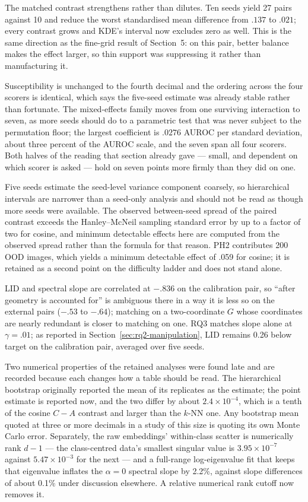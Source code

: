 \documentclass[11pt,a4paper]{article}
\begin{document}
The matched contrast strengthens rather than dilutes. Ten seeds yield 27 pairs
against 10 and reduce the worst standardised mean difference from $.137$ to
$.021$; every contrast grows and KDE's interval now excludes zero as well. This
is the same direction as the fine-grid result of Section~5: on this pair, better
balance makes the effect larger, so thin support was suppressing it rather than
manufacturing it.

Susceptibility is unchanged to the fourth decimal and the ordering across the
four scorers is identical, which says the five-seed estimate was already stable
rather than fortunate. The mixed-effects family moves from one surviving
interaction to seven, as more seeds should do to a parametric test that was
never subject to the permutation floor; the largest coefficient is $.0276$
AUROC per standard deviation, about three percent of the AUROC scale, and the
seven span all four scorers. Both halves of the reading that section already
gave --- small, and dependent on which scorer is asked --- hold on seven points
more firmly than they did on one.

Five seeds estimate the seed-level variance component coarsely, so hierarchical intervals are narrower than a seed-only analysis and should not be read as though more seeds were available. The observed between-seed spread of the paired contrast exceeds the Hanley--McNeil sampling standard error by up to a factor of two for cosine, and minimum detectable effects here are computed from the observed spread rather than the formula for that reason. PH2 contributes 200 OOD images, which yields a minimum detectable effect of .059 for cosine; it is retained as a second point on the difficulty ladder and does not stand alone.

LID and spectral slope are correlated at $-.836$ on the calibration pair, so ``after geometry is accounted for'' is ambiguous there in a way it is less so on the external pairs ($-.53$ to $-.64$); matching on a two-coordinate $G$ whose coordinates are nearly redundant is closer to matching on one. RQ3 matches slope alone at $\gamma=.01$; as reported in Section~\ref{sec:rq2-manipulation}, LID remains 0.26 below target on the calibration pair, averaged over five seeds.

Two numerical properties of the retained analyses were found late and are
recorded because each changes how a table should be read. The hierarchical
bootstrap originally reported the mean of its replicates as the estimate; the
point estimate is reported now, and the two differ by about $2.4\times10^{-4}$,
which is a tenth of the cosine $C-A$ contrast and larger than the $k$-NN one.
Any bootstrap mean quoted at three or more decimals in a study of this size is
quoting its own Monte Carlo error. Separately, the raw embeddings' within-class
scatter is numerically rank $d-1$ --- the class-centred data's smallest singular
value is $3.95\times10^{-7}$ against $5.47\times10^{-3}$ for the next --- and a
full-range log-eigenvalue fit that keeps that eigenvalue inflates the
$\alpha=0$ spectral slope by 2.2\%, against slope differences of about 0.1\%
under discussion elsewhere. A relative numerical rank cutoff now removes it.
\end{document}
